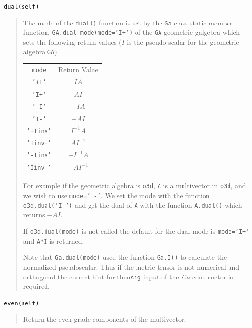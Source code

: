 \documentclass[12pt]{report}
\newcommand{\T}[1]{\texttt{#1}}
\begin{document}
\T{dual(self)}
\begin{quote}
   The mode of the \T{dual()} function is set by the \T{Ga} class static member function, \T{GA.dual\_mode(mode='I+')} of the \T{GA} geometric
   galgebra which sets the following return values ($I$ is the pseudo-scalar for the geometric algebra \T{GA})
   \begin{center}
   \begin{tabular}{cc}
        \T{mode} & Return Value \\
        \T{'+I'} & $IA$ \\
        \T{'I+'} & $AI$ \\
        \T{'-I'} & $-IA$ \\
        \T{'I-'} & $-AI$ \\
        \T{'+Iinv'} & $I^{-1}A$ \\
        \T{'Iinv+'} & $AI^{-1}$ \\
        \T{'-Iinv'} & $-I^{-1}A$ \\
        \T{'Iinv-'} & $-AI^{-1}$
   \end{tabular}
   \end{center}

   For example if the geometric algebra is \T{o3d}, \T{A} is a multivector in \T{o3d}, and we wish to use \T{mode='I-'}.  We set
   the mode with the function
   \T{o3d.dual('I-')} and get the dual of \T{A} with the function \T{A.dual()} which returns $-AI$.

   If \T{o3d.dual(mode)} is not called the default for the dual mode is \T{mode='I+'} and \T{A*I} is returned.
   
   Note that \T{Ga.dual(mode)} used the function \T{Ga.I()} to calculate the normalized pseudoscalar.  Thus if the metric tensor is
   not numerical and orthogonal the correct hint for then\T{sig} input of the \emph{Ga} constructor is required. 
\end{quote}

\T{even(self)}
\begin{quote}
   Return the even grade components of the multivector.
\end{quote}
\end{document}
